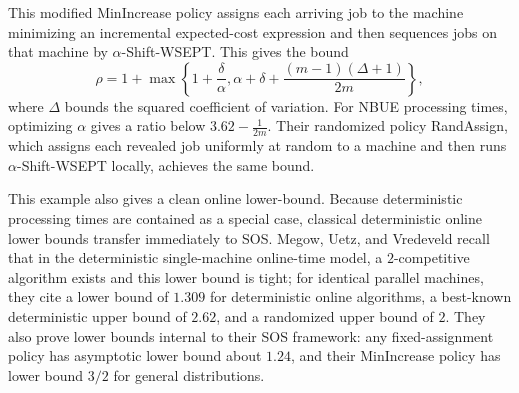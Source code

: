 This modified MinIncrease policy assigns each arriving job to the machine minimizing an incremental expected-cost expression and then sequences jobs on that machine by \(\alpha\)-Shift-WSEPT. This gives the bound
\[
\rho = 1+\max \left\{1+\frac{\delta}{\alpha}, \alpha+\delta+\frac{(m-1)(\Delta+1)}{2m}\right\},
\]
where \(\Delta\) bounds the squared coefficient of variation. For NBUE processing times, optimizing \(\alpha\) gives a ratio below \(3.62-\frac{1}{2m}\). Their randomized policy RandAssign, which assigns each revealed job uniformly at random to a machine and then runs \(\alpha\)-Shift-WSEPT locally, achieves the same bound.

This example also gives a clean online lower-bound. Because deterministic processing times are contained as a special case, classical deterministic online lower bounds transfer immediately to SOS. Megow, Uetz, and Vredeveld recall that in the deterministic single-machine online-time model, a \(2\)-competitive algorithm exists and this lower bound is tight; for identical parallel machines, they cite a lower bound of \(1.309\) for deterministic online algorithms, a best-known deterministic upper bound of \(2.62\), and a randomized upper bound of \(2\). They also prove lower bounds internal to their SOS framework: any fixed-assignment policy has asymptotic lower bound about \(1.24\), and their MinIncrease policy has lower bound \(3/2\) for general distributions. 







